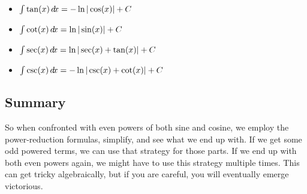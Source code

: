 \documentclass{ximera}
\begin{document}
\begin{theorem}\hfil
  \begin{itemize}
  \item $\int \tan(x) \mathop{}\!d\! x = -\ln|\cos(x)| + C$
  \item $\int \cot(x) \mathop{}\!d\! x = \ln|\sin(x)| + C$
  \item $\int \sec(x) \mathop{}\!d\! x = \ln|\sec(x) + \tan(x)| + C$
  \item $\int \csc(x) \mathop{}\!d\! x = -\ln|\csc(x) + \cot(x)| + C$
  \end{itemize}
\end{theorem}



\subsection{Summary}

So when confronted with even powers of both sine and cosine, we employ
the power-reduction formulas, simplify, and see what we end up with.
If we get some odd powered terms, we can use that strategy for those
parts.  If we end up with both even powers again, we might have to use
this strategy multiple times.  This can get tricky algebraically, but
if you are careful, you will eventually emerge victorious.
\end{document}
